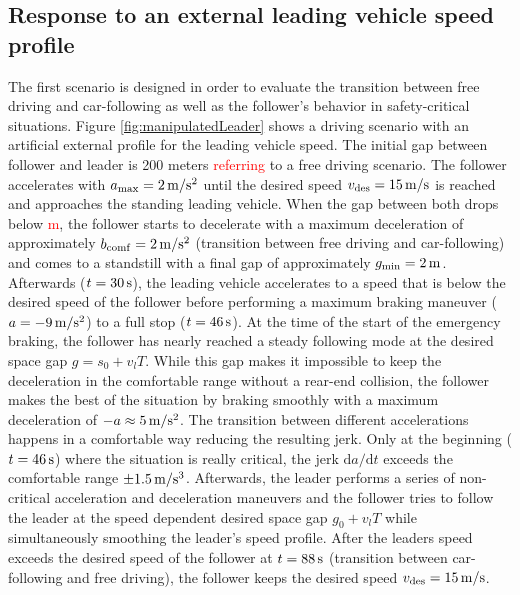\documentclass[review]{elsarticle}
\providecommand{\red}[1]{\textcolor{red}{#1}}
\providecommand{\martin}[1]{\red{#1}} %
\providecommand{\sub}[1]{_{\mathrm{#1}}}  %
\providecommand{\3}{{\ss}}
\begin{document}
\subsection{Response to an external leading vehicle speed profile}
The first scenario is designed in order to evaluate the transition between free driving and car-following as well as the follower's behavior in safety-critical situations. 
Figure \ref{fig:manipulatedLeader} shows a driving scenario with an
artificial external profile for the leading vehicle speed. The initial
gap between 
follower and leader is 200 meters \martin{referring} to a free driving
scenario. The follower accelerates with $a\sub{max} = \unit[2]{m/s^2}$ until
the desired speed $v\sub{des} = \unit[15]{m/s} $ is reached and approaches
the standing leading vehicle. When the gap between both drops below 
\martin{\unit[70]{m}},
the follower starts to decelerate with a maximum
  deceleration of approximately $b_{\rm
  comf} = \unit[2]{m/s^2}$ (transition between free driving and car-following)
and comes to a standstill with a final gap of approximately 
$g\sub{min} = \unit[2]{m}$. Afterwards ($t=\unit[30]{s}$),  the leading vehicle accelerates to a speed
that is below the desired speed of the follower before performing a
maximum braking maneuver ($a=\unit[-9]{m/s^2}$) to a full stop ($t=\unit[46]{s}$). At the time of the start of the
  emergency braking, the follower has nearly reached a steady
  following mode at the desired space gap $g=s_0+v_l T$. While this
  gap makes it impossible to keep the deceleration in the comfortable
  range without a rear-end collision, the follower makes the best of
  the situation by braking smoothly with a maximum deceleration of $-a
  \approx \unit[5]{m/s^2}$.  The transition between different
accelerations happens in a comfortable way reducing the resulting
jerk. Only at the beginning ($t=\unit[46]{s}$) where the situation is
really critical, the jerk $\text{d}a/\text{d}t$ exceeds the comfortable range 
$\pm \unit[1.5]{m/s^3}$. Afterwards, the leader performs a series of
non-critical acceleration and deceleration maneuvers and the follower
tries to follow the leader at the speed dependent desired space gap
$g_0+v_lT$ while simultaneously smoothing the leader's speed profile. After the leaders speed exceeds the desired speed of the follower at $t=\unit[88]{s}$ (transition between car-following and free driving), the follower keeps the desired speed $v\sub{des} = \unit[15]{m/s} $.
\end{document}
